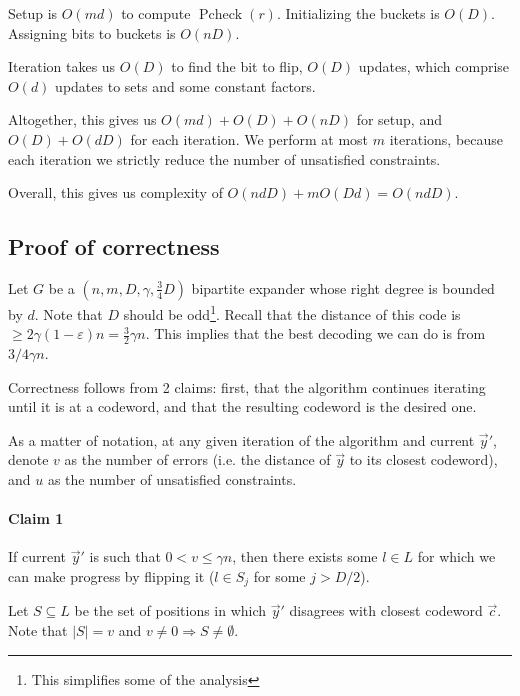 \documentclass{idc_msc}
\DeclareMathOperator*{\Pcheck}{Pcheck}
\begin{document}
Setup is \(O(md)\) to compute \(\Pcheck(r)\).
Initializing the buckets is \(O(D)\).
Assigning bits to buckets is \(O(nD)\).

Iteration takes us \(O(D)\) to find the bit to flip, \(O(D)\) updates, which comprise \(O(d)\) updates to sets and some constant factors.

Altogether, this gives us \(O(md) + O(D) + O(nD)\) for setup, and \(O(D) + O(dD)\) for each iteration.
We perform at most \(m\) iterations, because each iteration we strictly reduce the number of unsatisfied constraints.

Overall, this gives us complexity of \(O(ndD) + mO(Dd) = O(ndD)\).

\subsection{Proof of correctness}

Let \(G\) be a \((n,m,D,\gamma, \frac{3}{4}D)\) bipartite expander whose right degree is bounded by \(d\).
Note that \(D\) should be odd\footnote{This simplifies some of the analysis}.
Recall that the distance of this code is \(\ge 2\gamma (1-\varepsilon) n = \frac{3}{2} \gamma n\).
This implies that the best decoding we can do is from \(3/4 \gamma n\).

Correctness follows from 2 claims: first, that the algorithm continues iterating until it is at a codeword, and that the resulting codeword is the desired one.

As a matter of notation, at any given iteration of the algorithm and current \(\vec{y}'\), denote \(v\) as the number of errors (i.e. the distance of \(\vec{y}\) to its closest codeword), and \(u\) as the number of unsatisfied constraints.

\paragraph{Claim 1}

If current \(\vec{y}'\) is such that \(0 < v \le \gamma n\), then there exists some \(l \in L\) for which we can make progress by flipping it (\(l \in S_j\) for some \(j > D/2\)).

Let \(S \subseteq L\) be the set of positions in which \(\vec{y}'\) disagrees with closest codeword \(\vec{c}\).
Note that \(|S| = v\) and \(v \ne 0 \Rightarrow S \ne \emptyset\).
\end{document}
